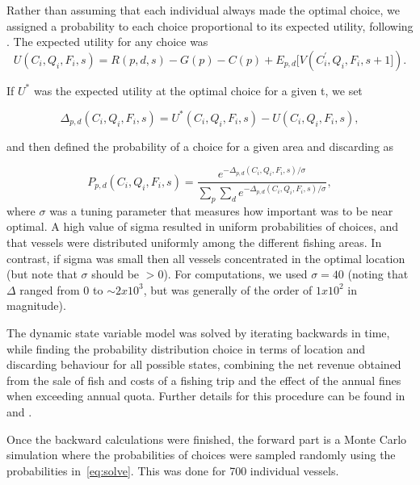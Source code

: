 \documentclass[12pt,oneline,a4paper,numbib]{ouparticle}
\numberwithin{equation}{subsection} %
\begin{document}
Rather than assuming that each individual always made the optimal choice, we assigned a probability to each choice proportional to its expected utility, following \cite{Dowling2011}. The expected utility for any choice was
\begin{equation}
U (C_i, Q_i, F_i, s) = R(p, d, s)- G(p) - C(p) + E_{p, d}[V (C_i^\prime, Q_i, F_i, s+1]).
\end{equation}

If $U^*$ was the expected utility at the optimal choice for a given t, we set

\begin{equation}
\Delta_{p, d}(C_i, Q_i, F_i, s) =  U^* (C_i, Q_i, F_i, s) - U (C_i, Q_i, F_i, s),
\end{equation}

and then defined the probability of a choice for a given area and discarding as	

\begin{equation} \label{eq:solve}
P_{p, d}(C_i, Q_i, F_i, s) = \frac
                {e^{ -\Delta_{p, d}(C_i, Q_i, F_i, s)/\sigma}}
                {\sum_p \sum_d e^{ -\Delta_{p, d}(C_i, Q_i, F_i, s)/\sigma}},
\end{equation}
where $\sigma$ was a tuning parameter that measures how important was to be near optimal. A high value of sigma resulted in uniform probabilities of choices, and that vessels were distributed uniformly among the different fishing areas. In contrast, if sigma was small then all vessels concentrated in the optimal location (but note that $\sigma$ should be $> 0$). For computations, we used $\sigma = 40$ (noting that $\Delta$ ranged from 0 to $\sim 2 x 10^{3}$, but was generally of the order of $1 x 10^2$ in magnitude).

The dynamic state variable model was solved by iterating backwards in time, while finding the probability distribution choice in terms of location and discarding behaviour for all possible states, combining the net revenue obtained from the sale of fish and costs of a fishing trip and the effect of the annual fines when exceeding annual quota. Further details for this procedure can be found in \cite{Alzorriz2018, Batsleer2016} and \cite{Dowling2011}.

Once the backward calculations were finished, the forward part is a Monte Carlo simulation where the probabilities of choices were sampled randomly using the probabilities in~\ref{eq:solve}. This was done for 700 individual vessels. 
\end{document}
